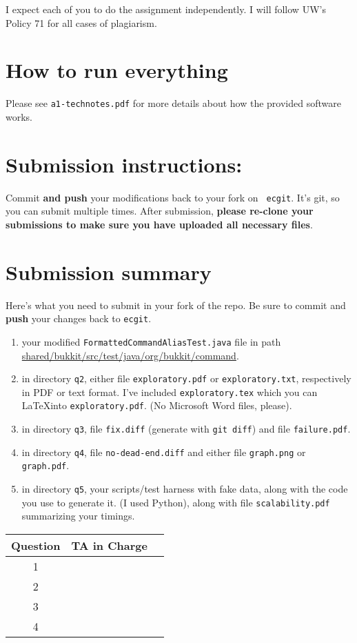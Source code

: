 \documentclass[10pt,hidelinks]{article}
\begin{document}
I expect each of you to do the assignment independently. I will follow UW's Policy 71 for all cases of plagiarism.
 
\section*{How to run everything}
Please see {\tt a1-technotes.pdf} for more details about how the provided software works.
\newpage
 \section*{Submission instructions:} 
Commit {\bf and push} your modifications back to your fork on {\tt
  ecgit}.  It's git, so you can submit multiple times. After
submission, {\bf please re-clone your submissions to make sure you
  have uploaded all necessary files}.
 
\section*{Submission summary}
Here's what you need to submit in your fork of the repo. Be sure to commit
and {\bf push} your changes back to {\tt ecgit}.
\begin{enumerate}
\item your modified {\tt FormattedCommandAliasTest.java} file in path
\url{shared/bukkit/src/test/java/org/bukkit/command}.
\item in directory {\tt q2}, either file {\tt exploratory.pdf} or {\tt exploratory.txt}, respectively
in PDF or text format. I've included {\tt exploratory.tex} which you can
\LaTeX into {\tt exploratory.pdf}. (No Microsoft Word files, please).
\item in directory {\tt q3}, file {\tt fix.diff} (generate with {\tt git diff}) 
and file {\tt failure.pdf}.
\item in directory {\tt q4}, file {\tt no-dead-end.diff} and
either file {\tt graph.png} or {\tt graph.pdf}.
\item in directory {\tt q5}, your scripts/test harness with fake data,
along with the code you use to generate it. (I used Python), along with 
file {\tt scalability.pdf} summarizing your timings.
\end{enumerate}
 
 \begin{center}
 \begin{tabular}{c|cc}
 Question   &  TA in Charge \\ \hline
1 &  \\ 
2 &  \\ 
3 &  \\ 
4 &  \\ 
 \end{tabular}
 \end{center}
\end{document}
